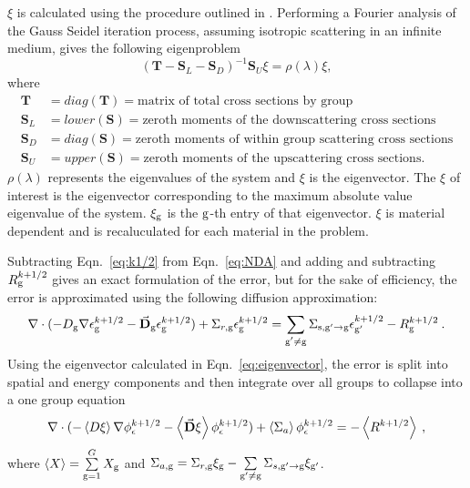   $\xi$ is calculated using the procedure outlined in \cite{evans-upscat}. Performing a Fourier analysis of the Gauss Seidel iteration process, assuming isotropic scattering in an infinite medium, gives the following eigenproblem
  \begin{equation}
      (\textbf{T} - \textbf{S}_L - \textbf{S}_D)^{-1}\textbf{S}_U \xi = \rho(\lambda)\xi,
    \label{eq:eigenvector}
  \end{equation}
  where
  \begin{align*}
      \textbf{T} &= diag(\textbf{T}) =  \text{matrix of total cross sections by group} \\
      \textbf{S}_L &= lower(\textbf{S}) = \text{zeroth moments of the downscattering cross sections} \\
      \textbf{S}_D &= diag(\textbf{S}) = \text{zeroth moments of within group scattering cross sections} \\
      \textbf{S}_U &= upper(\textbf{S}) = \text{zeroth moments of the upscattering cross sections.}
  \end{align*}
  $\rho(\lambda)$ represents the eigenvalues of the system and $\xi$ is the eigenvector. The $\xi$ of interest is the eigenvector corresponding to the maximum absolute value eigenvalue of the system. $\xi_{\mathrm{g}}$ is the $\mathrm{g}$-th entry of that eigenvector. $\xi$ is material dependent and is recaluculated for each material in the problem.

  Subtracting Eqn.~\eqref{eq:k1/2} from Eqn.~\eqref{eq:NDA} and adding and subtracting $R_{\mathrm{g}}^{k+1/2}$ gives an exact formulation of the error, but for the sake of efficiency, the error is approximated using the following diffusion approximation:
  \begin{equation}
  \nabla\cdot(-D_{\mathrm{g}}  \nabla \epsilon_{\mathrm{g}}^{k+1/2} - \vec{\bf D}_{\mathrm{g}}
  \epsilon_{\mathrm{g}}^{k+1/2}) + \Sigma_{r,\mathrm{g}}  \epsilon_{\mathrm{g}}^{k+1/2} =  \sum\limits_{\substack{{\mathrm{g}'}\neq\mathrm{g}}} \Sigma_{\mathrm{s},\mathrm{g}' \to\mathrm{g}}  \epsilon_{\mathrm{g}'}^{k+1/2} -  R^{k+1/2}_{\mathrm{g}} \:.
  \end{equation}
  Using the eigenvector calculated in Eqn.~\eqref{eq:eigenvector}, the error is split into spatial and energy components and then integrate over all groups to collapse into a one group equation
  \begin{equation}
  \nabla\cdot(-\left< D \xi \right> \nabla \phi_{\epsilon}^{k+1/2} - \left<\vec{\bf D} \xi
  \right> \phi_{\epsilon}^{k+1/2}) + \left< \Sigma_{a} \right> \phi_{\epsilon}^{k+1/2} = - \left< R^{k+1/2} \right> \:,\label{eq:collapsed}
  \end{equation}
  where $\left< X \right> = \sum\limits_{\mathrm{g} = 1}^G X_{\mathrm{g}} $ and $\Sigma_{a,\mathrm{g}}  = \Sigma_{r,\mathrm{g}}\xi_{\mathrm{g}} - \sum\limits_{{\mathrm{g}'}\neq\mathrm{g}} \Sigma_{s,\mathrm{g}'\rightarrow \mathrm{g}} \xi_{\mathrm{g}'}$.

